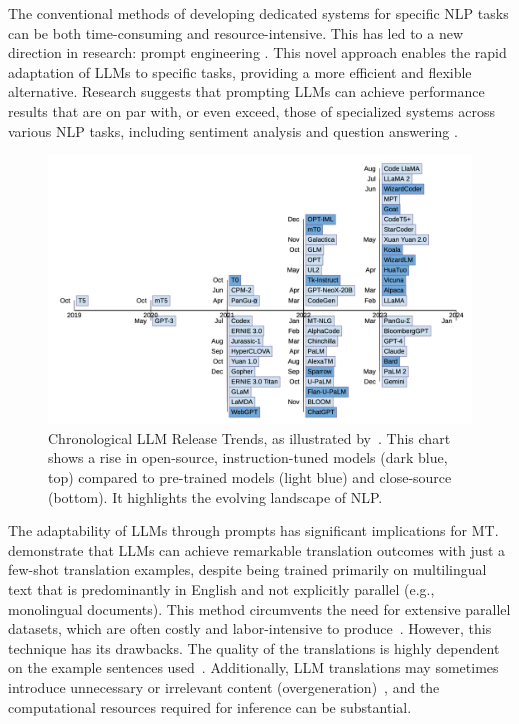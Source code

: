 {{The conventional methods of developing dedicated systems for specific NLP tasks can be both time-consuming and resource-intensive. This has led to a new direction in research: prompt engineering \parencite{qiao-etal-2023, zhou-etal-2022-prompt}. This novel approach enables the rapid adaptation of LLMs to specific tasks, providing a more efficient and flexible alternative. Research suggests that prompting LLMs can achieve performance results that are on par with, or even exceed, those of specialized systems across various NLP tasks, including sentiment analysis and question answering \parencite{Radford2019LanguageMA}.

\begin{figure}[htb]
\centering
\includegraphics[width=1\textwidth]{textual/Figuras/LLM-releases.png}
\caption{Chronological LLM Release Trends, as illustrated by~\textcite{naveed2024comprehensive}. This chart shows a rise in open-source, instruction-tuned models (dark blue, top) compared to pre-trained models (light blue) and close-source (bottom). It highlights the evolving landscape of NLP.}
\label{fig: LLM-releases} 
\end{figure}

The adaptability of LLMs through prompts has significant implications for MT. \textcite{yuhan-etal-2023-unleashing} demonstrate that LLMs can achieve remarkable translation outcomes with just a few-shot translation examples, despite being trained primarily on multilingual text that is predominantly in English and not explicitly parallel (e.g., monolingual documents). This method circumvents the need for extensive parallel datasets, which are often costly and labor-intensive to produce~\parencite{garcia2023unreasonable}. However, this technique has its drawbacks. The quality of the translations is highly dependent on the example sentences used~\parencite{vilar2023prompting}. Additionally, LLM translations may sometimes introduce unnecessary or irrelevant content (overgeneration)~\parencite{bawden2023investigating}, and the computational resources required for inference can be substantial.


}}
